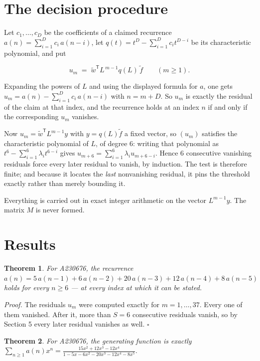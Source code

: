 \documentclass[11pt]{article}
\newtheorem{theorem}{Theorem}
\theoremstyle{definition}
\begin{document}
\section{The decision procedure}

Let $c_1,\dots,c_D$ be the coefficients of a claimed recurrence $a(n) = \sum_{i=1}^{D} c_i\,a(n-i)$, let $q(t) = t^{D} - \sum_{i=1}^{D} c_i t^{D-i}$ be its characteristic polynomial, and put

\[u_m \;=\; \tilde w^{\mathsf T} L^{\,m-1} q(L)\,\tilde f \qquad (m \ge 1).\]

Expanding the powers of $L$ and using the displayed formula for $a$, one gets $u_m = a(n) - \sum_{i=1}^{D} c_i\,a(n-i)$ with $n = m + D$. So $u_m$ is exactly the residual of the claim at that index, and the recurrence holds at an index $n$ if and only if the corresponding $u_m$ vanishes.

Now $u_m = \tilde w^{\mathsf T} L^{m-1} y$ with $y = q(L)\tilde f$ a fixed vector, so $(u_m)$ satisfies the characteristic polynomial of $L$, of degree $6$: writing that polynomial as $t^{6} - \sum_{i=1}^{6} \lambda_i t^{6-i}$ gives $u_{m+6} = \sum_{i=1}^{6} \lambda_i u_{m+6-i}$. Hence $6$ consecutive vanishing residuals force every later residual to vanish, by induction. The test is therefore finite; and because it locates the {\itshape last} nonvanishing residual, it pins the threshold exactly rather than merely bounding it.

Everything is carried out in exact integer arithmetic on the vector $L^{m-1}y$. The matrix $M$ is never formed.

\section{Results}

\begin{theorem} For A230676, the recurrence $a(n) = 5\,a(n-1) + 6\,a(n-2) + 20\,a(n-3) + 12\,a(n-4) + 8\,a(n-5)$ holds for every $n \ge 6$ --- at every index at which it can be stated.\end{theorem}

{\itshape Proof.} The residuals $u_m$ were computed exactly for $m = 1,\dots,37$. Every one of them vanished. After it, more than $S = 6$ consecutive residuals vanish, so by Section 5 every later residual vanishes as well. $\square$

\begin{theorem} For A230676, the generating function is exactly $\sum_{n\ge 1} a(n)x^n = \frac{15x^{2} + 12x^{3} - 12x^{4}}{1 - 5x - 6x^{2} - 20x^{3} - 12x^{4} - 8x^{5}}$.\end{theorem}
\end{document}
